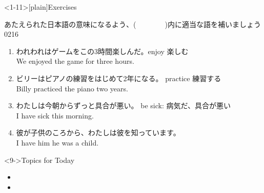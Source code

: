 \documentclass[aspectratio=169,xcolor={dvipsnames,table}]{beamer}
\newcommand{\myaudio}[1]{\href{#1}{\faVolumeUp}}
\begin{document}
\begin{frame}<1-11>[plain]{Exercises}

{\small あたえられた日本語の意味になるよう、(~~~~~~~~)内に適当な語を補いましょ}う%
\hfill{\tiny 0216}\,{\scriptsize \myaudio{./audio/012_have_pp_keizoku_05.mp3}}

\begin{enumerate}
 \item {\small われわれはゲームをこの3時間楽しんだ。}\hfill{}{\scriptsize enjoy  楽しむ}\\
We  enjoyed the game for three hours.%
       \hfill{}
 \item {\small ビリーはピアノの練習をはじめて2年になる。}%
       \hfill{}{\scriptsize practice  練習する}\\
Billy  practiced the piano  two years.
 \item {\small わたしは今朝からずっと具合が悪い。}%
       \hfill{}{\scriptsize be sick: 病気だ、具合が悪い}\\
I have  sick  this morning.%
       \hfill{}
 \item {\small 彼が子供のころから、わたしは彼を知っています。}\\
I have  him  he was a child.%
       \hfill{}
\end{enumerate}

\begin{block}<9->{Topics for Today}\small
\begin{itemize}[square]
 \item {}
 \item {}
\end{itemize}
      \end{block}
\end{frame}
\end{document}
